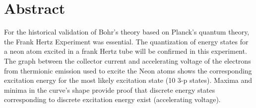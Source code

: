 \section{Abstract}
	For the historical validation of Bohr's theory based on Planck's quantum theory, the Frank Hertz Experiment was essential. The quantization of energy states for a neon atom excited in a frank Hertz tube will be confirmed in this experiment. The graph between the collector current and accelerating voltage of the electrons from thermionic emission used to excite the Neon atoms shows the corresponding excitation energy for the most likely excitation state (10 3-p states). Maxima and minima in the curve's shape provide proof that discrete energy states corresponding to discrete excitation energy exist (accelerating voltage).
